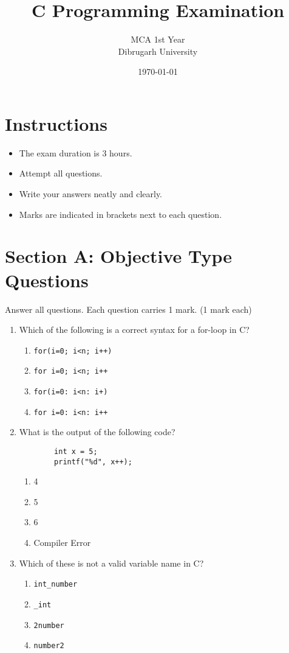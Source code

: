 \documentclass[12pt, a4paper]{article}
\title{\textbf{C Programming Examination}}
\author{MCA 1st Year \\ Dibrugarh University}
\date{\today}
\begin{document}
\maketitle

\section*{Instructions}
\begin{itemize}
    \item The exam duration is 3 hours.
    \item Attempt all questions.
    \item Write your answers neatly and clearly.
    \item Marks are indicated in brackets next to each question.
\end{itemize}

\newpage

    
\section*{Section A: Objective Type Questions}  



\flushleft Answer all questions. Each question carries 1 mark.
\flushright(1 mark each) \\
\begin{enumerate}
    \item Which of the following is a correct syntax for a for-loop in C?
    \begin{enumerate}
        \item \texttt{for(i=0; i<n; i++)}
        \item \texttt{for i=0; i<n; i++}
        \item \texttt{for(i=0: i<n: i+)}
        \item \texttt{for i=0: i<n: i++}
    \end{enumerate}

    \item What is the output of the following code?
    \begin{verbatim}
        int x = 5;
        printf("%d", x++);
    \end{verbatim}
    \begin{enumerate}
        \item 4
        \item 5
        \item 6
        \item Compiler Error
    \end{enumerate}

    \item Which of these is not a valid variable name in C?
    \begin{enumerate}
        \item \texttt{int\_number}
        \item \texttt{\_int}
        \item \texttt{2number}
        \item \texttt{number2}
    \end{enumerate}

  
\end{enumerate}
\end{document}
